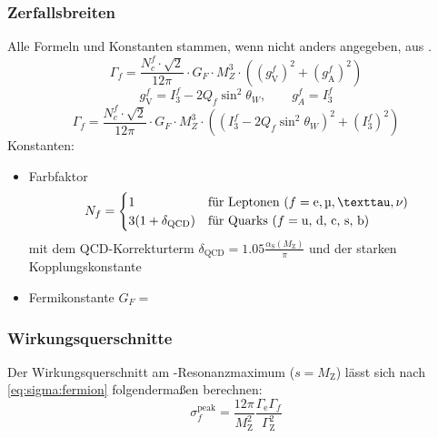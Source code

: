 \subsubsection*{Zerfallsbreiten}
Alle Formeln und Konstanten stammen, wenn nicht anders angegeben, aus \cite{manualmuc}.
\begin{equation}
    \Gamma_f = \frac{N_c^f \cdot \sqrt{2}}{12 \pi} \cdot G_F \cdot M_Z^3 \cdot \left( \left( g_\text{V}^f \right)^2 + \left( g_\text{A}^f \right)^2 \right)
\end{equation}
\begin{equation}
    g_\text{V}^f = I_3^f - 2 Q_f \sin^2 \theta_W, \qquad g_A^f = I_3^f
\end{equation}
\begin{equation}
    \Gamma_f = \frac{N_c^f \cdot \sqrt{2}}{12 \pi} \cdot G_F \cdot M_Z^3 \cdot \left( \left( I_3^f - 2 Q_f \sin^2 \theta_W \right)^2 + \left( I_3^f \right)^2 \right)
\end{equation}
Konstanten:
\begin{itemize}
    \item Farbfaktor
    \begin{equation}
        N_f =
        \begin{cases}
            1 & \text{für Leptonen } (f = \text{e}, \text{\textmu}, \text{\texttau}, \nu) \\
            3 (1 + \delta_\text{QCD}) & \text{für Quarks } (f = \text{u, d, c, s, b})
        \end{cases}
    \end{equation}
    mit dem QCD-Korrekturterm $\delta_\text{QCD} = 1.05 \frac{\alpha_\text{S}(M_\text{Z})}{\pi}$ und der starken Kopplungskonstante 
    \item Fermikonstante $G_F = $
\end{itemize}
\subsubsection{Wirkungsquerschnitte}
Der Wirkungsquerschnitt am \Z-Resonanzmaximum ($s = M_\text{Z}$) lässt sich nach \autoref{eq:sigma:fermion} folgendermaßen berechnen:
\begin{equation}
    \sigma_f^\text{peak} = \frac{12 \pi}{M_\text{Z}^2} \frac{\Gamma_\text{e} \Gamma_f}{\Gamma_\text{Z}^2}
\end{equation}